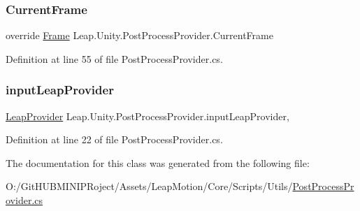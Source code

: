 \subsubsection{\texorpdfstring{CurrentFrame}{CurrentFrame}}
{\footnotesize\ttfamily override \mbox{\hyperlink{class_leap_1_1_frame}{Frame}} Leap.\+Unity.\+Post\+Process\+Provider.\+Current\+Frame\hspace{0.3cm}{\ttfamily [get]}}



Definition at line 55 of file Post\+Process\+Provider.\+cs.

\mbox{\label{class_leap_1_1_unity_1_1_post_process_provider_ad036d0a5c3927ff97f05be7508e1baeb}} 
\subsubsection{\texorpdfstring{inputLeapProvider}{inputLeapProvider}}
{\footnotesize\ttfamily \mbox{\hyperlink{class_leap_1_1_unity_1_1_leap_provider}{Leap\+Provider}} Leap.\+Unity.\+Post\+Process\+Provider.\+input\+Leap\+Provider\hspace{0.3cm}{\ttfamily [get]}, {\ttfamily [set]}}



Definition at line 22 of file Post\+Process\+Provider.\+cs.



The documentation for this class was generated from the following file\+:\begin{DoxyCompactItemize}
\item 
O\+:/\+Git\+H\+U\+B\+M\+I\+N\+I\+P\+Roject/\+Assets/\+Leap\+Motion/\+Core/\+Scripts/\+Utils/\mbox{\hyperlink{_post_process_provider_8cs}{Post\+Process\+Provider.\+cs}}\end{DoxyCompactItemize}
